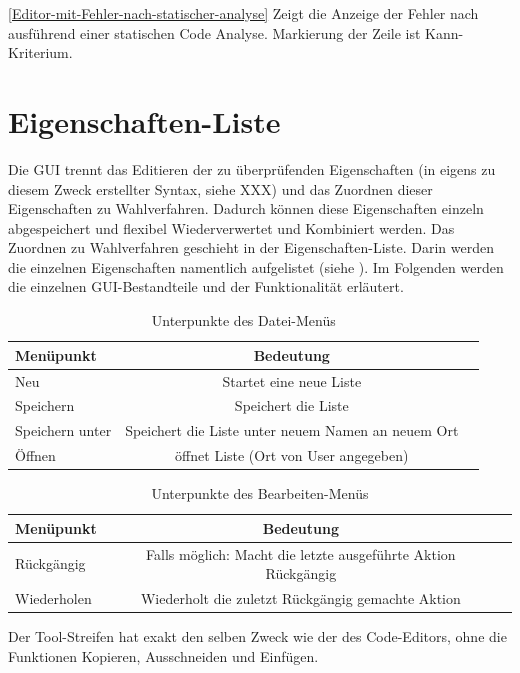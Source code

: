 \documentclass[a4paper]{scrreprt}
\begin{document}
\ref{Editor-mit-Fehler-nach-statischer-analyse} Zeigt die Anzeige der Fehler nach ausführend einer statischen Code Analyse. Markierung der Zeile ist Kann-Kriterium.

\section{Eigenschaften-Liste}
Die GUI trennt das Editieren der zu überprüfenden Eigenschaften (in eigens zu diesem Zweck erstellter Syntax, siehe XXX) und das Zuordnen dieser Eigenschaften zu Wahlverfahren. Dadurch können diese Eigenschaften einzeln abgespeichert und flexibel Wiederverwertet und Kombiniert werden. Das Zuordnen zu Wahlverfahren geschieht in der Eigenschaften-Liste. Darin werden die einzelnen Eigenschaften namentlich aufgelistet (siehe ). Im Folgenden werden die einzelnen \ac{GUI}-Bestandteile und der Funktionalität erläutert.

\begin{table}[H]
\begin{tabular}{lcr} 
Menüpunkt & Bedeutung \\
\hline
Neu & Startet eine neue Liste \\
Speichern & Speichert die Liste \\
Speichern unter & Speichert die Liste unter neuem Namen an neuem Ort \\
Öffnen & öffnet Liste (Ort von User angegeben)
\end{tabular}
\label{Eigenschaftenliste-Datei-Menüpunkte}
\caption{Unterpunkte des Datei-Menüs}
\end{table}

\begin{table}[H]
\begin{tabular}{lcr} 
Menüpunkt & Bedeutung \\
\hline
Rückgängig & Falls möglich: Macht die letzte ausgeführte Aktion Rückgängig \\
Wiederholen & Wiederholt die zuletzt Rückgängig gemachte Aktion 
\end{tabular}
\label{Eigenschaftenliste-Bearbeiten-Menüpunkte}
\caption{Unterpunkte des Bearbeiten-Menüs}
\end{table}

Der Tool-Streifen hat exakt den selben Zweck wie der des Code-Editors, ohne die Funktionen Kopieren, Ausschneiden und Einfügen.
\end{document}
